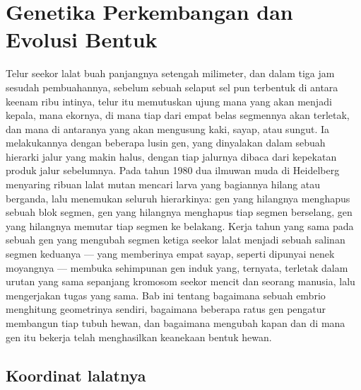 \chapter{Genetika Perkembangan dan Evolusi Bentuk}\label{ch:b3:developmental-genetics}

Telur seekor lalat buah panjangnya setengah milimeter, dan dalam tiga jam
sesudah pembuahannya, sebelum sebuah selaput sel pun terbentuk di antara
keenam ribu intinya, telur itu memutuskan ujung mana yang akan menjadi kepala, mana
ekornya, di mana tiap dari empat belas segmennya akan terletak, dan mana di antaranya
yang akan mengusung kaki, sayap, atau sungut. Ia melakukannya dengan beberapa lusin gen,
yang dinyalakan dalam sebuah hierarki jalur yang makin halus, dengan tiap jalurnya dibaca dari
kepekatan produk jalur sebelumnya. Pada tahun 1980
dua ilmuwan muda di Heidelberg menyaring ribuan lalat mutan
mencari larva yang bagiannya hilang atau berganda, lalu menemukan seluruh
hierarkinya: gen yang hilangnya menghapus sebuah blok segmen, gen yang
hilangnya menghapus tiap segmen berselang, gen yang hilangnya memutar tiap segmen
ke belakang. Kerja tahun yang sama pada sebuah gen yang mengubah segmen ketiga seekor lalat
menjadi sebuah salinan segmen keduanya --- yang memberinya empat sayap, seperti dipunyai
nenek moyangnya --- membuka sehimpunan gen induk yang, ternyata,
terletak dalam urutan yang sama sepanjang kromosom seekor mencit dan seorang manusia,
lalu mengerjakan tugas yang sama. Bab ini tentang bagaimana sebuah embrio menghitung
geometrinya sendiri, bagaimana beberapa ratus gen pengatur membangun tiap tubuh
hewan, dan bagaimana mengubah kapan dan di mana gen itu bekerja telah menghasilkan
keanekaan bentuk hewan.

\section{Koordinat lalatnya}

